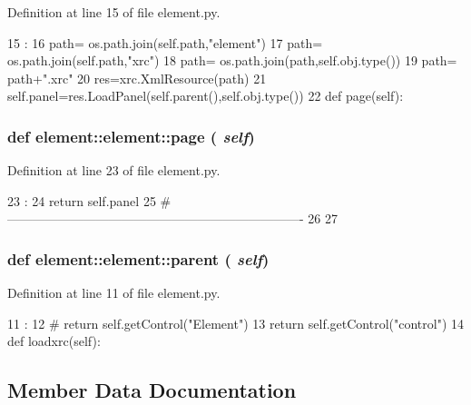 Definition at line 15 of file element.py.


\begin{DoxyCode}
15                      :
16         path= os.path.join(self.path,"element")
17         path= os.path.join(self.path,"xrc")
18         path= os.path.join(path,self.obj.type())
19         path= path+".xrc"
20         res=xrc.XmlResource(path)
21         self.panel=res.LoadPanel(self.parent(),self.obj.type())
22             
    def page(self):
\end{DoxyCode}
\hypertarget{classelement_1_1element_acb01482fd72cc106f0e16e08c4df276a}{
\subsubsection[{page}]{\setlength{\rightskip}{0pt plus 5cm}def element::element::page ( {\em self})}}
\label{classelement_1_1element_acb01482fd72cc106f0e16e08c4df276a}


Definition at line 23 of file element.py.


\begin{DoxyCode}
23                   :
24         return self.panel
25 #----------------------------------------------------------------------
26 
27     
    
\end{DoxyCode}
\hypertarget{classelement_1_1element_a2010faa4da4d94ff8deaaaf74bbc6ba3}{
\subsubsection[{parent}]{\setlength{\rightskip}{0pt plus 5cm}def element::element::parent ( {\em self})}}
\label{classelement_1_1element_a2010faa4da4d94ff8deaaaf74bbc6ba3}


Definition at line 11 of file element.py.


\begin{DoxyCode}
11                     :
12 #        return self.getControl("Element")
13         return self.getControl("control")
14    
    def loadxrc(self):
\end{DoxyCode}


\subsection{Member Data Documentation}
\hypertarget{classobject_1_1object_a4fbaf843d1f40843b2c3895cb73ffada}{
\subsubsection[{cat}]{}}
\label{classobject_1_1object_a4fbaf843d1f40843b2c3895cb73ffada}


